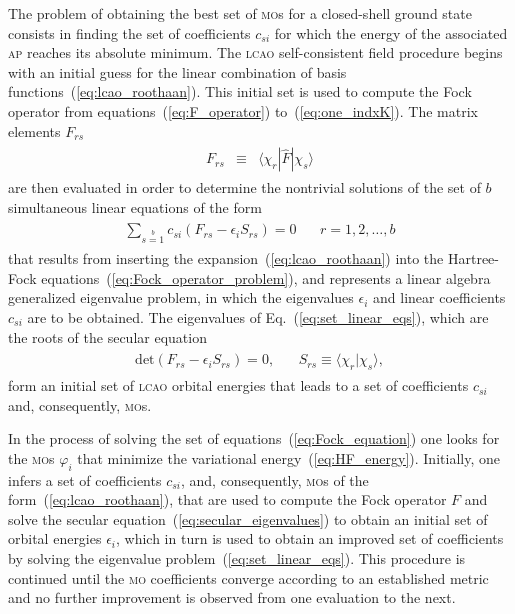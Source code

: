 The problem of obtaining the best set of \textsc{mo}s for a
closed-shell ground state consists in finding the set of coefficients
$c_{si}$ for which the energy of the associated \textsc{ap} reaches
its absolute minimum. The \textsc{lcao} self-consistent field
procedure begins with an initial guess for the linear combination of
basis functions~(\ref{eq:lcao_roothaan}). This initial set is used to
compute the Fock operator from equations~(\ref{eq:F_operator})
to~(\ref{eq:one_indxK}). The matrix elements $F_{rs}$
%
\begin{eqnarray}
  \begin{split}
    F_{rs} & \equiv & \langle \chi_{r} | \hat{F} | \chi_{s} \rangle
  \end{split}
  \label{eq:F_matrix}
\end{eqnarray}
%
are then evaluated in order to determine the nontrivial solutions of
the set of $b$ simultaneous linear equations of the form
%
\begin{eqnarray}
  \begin{split}
    \sum\limits_{s=1}\limits^{b} c_{si} (F_{rs} - \epsilon_{i}S_{rs}) = 0 &
    ~~~~ r = 1,2,\dots,b
  \end{split}
  \label{eq:set_linear_eqs}
\end{eqnarray}
%
that results from inserting the expansion~(\ref{eq:lcao_roothaan})
into the Hartree-Fock equations~(\ref{eq:Fock_operator_problem}), and
represents a linear algebra generalized eigenvalue problem, in which
the eigenvalues $\epsilon_{i}$ and linear coefficients $c_{si}$ are to
be obtained. The eigenvalues of Eq.~(\ref{eq:set_linear_eqs}), which
are the roots of the secular equation~\cite{Roothaan_HF,Levine_QChem}
%
\begin{eqnarray}
  \begin{split}
    \mathrm{det} (F_{rs} - \epsilon_{i}S_{rs}) = 0, &
    ~~~~ S_{rs} \equiv \langle \chi_{r} | \chi_{s} \rangle,
  \end{split}
  \label{eq:secular_eigenvalues}
\end{eqnarray}
%
form an initial set of \textsc{lcao} orbital energies that leads to a
set of coefficients $c_{si}$ and, consequently, \textsc{mo}s.

In the process of solving the set of
equations~(\ref{eq:Fock_equation}) one looks for the \textsc{mo}s
$\varphi_{i}$ that minimize the variational
energy~(\ref{eq:HF_energy}). Initially, one infers a set of
coefficients $c_{si}$, and, consequently, \textsc{mo}s of the
form~(\ref{eq:lcao_roothaan}), that are used to compute the Fock
operator $F$ and solve the secular
equation~(\ref{eq:secular_eigenvalues}) to obtain an initial set of
orbital energies $\epsilon_{i}$, which in turn is used to obtain an
improved set of coefficients by solving the eigenvalue
problem~(\ref{eq:set_linear_eqs}). This procedure is continued until
the \textsc{mo} coefficients converge according to an established
metric and no further improvement is observed from one evaluation to
the next.

